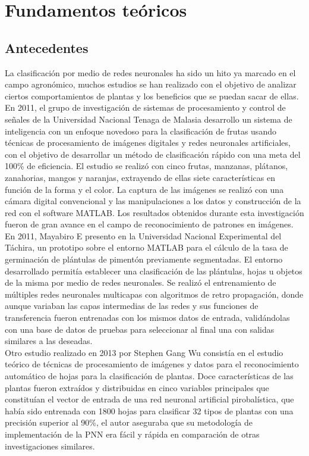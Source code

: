 \chapter{Fundamentos teóricos}

\section{Antecedentes}

La clasificación por medio de redes neuronales ha sido un hito ya marcado en el campo agronómico, muchos estudios se han realizado con el objetivo de analizar ciertos comportamientos de plantas y los beneficios que se puedan sacar de ellas. En 2011, el grupo de investigación de sistemas de procesamiento y control de señales de la Universidad Nacional Tenaga de Malasia desarrollo un sistema de inteligencia con un enfoque novedoso para la clasificación de frutas usando técnicas de procesamiento de imágenes digitales y redes neuronales artificiales, con el objetivo de desarrollar un método de clasificación rápido con una meta del 100\% de eficiencia. El estudio se realizó con cinco frutas, manzanas, plátanos, zanahorias, mangos y naranjas, extrayendo de ellas siete características en función de la forma y el color. La captura de las imágenes se realizó con una cámara digital convencional y las manipulaciones a los datos y construcción de la red con el software MATLAB. Los resultados obtenidos durante esta investigación fueron de gran avance en el campo de reconocimiento de patrones en imágenes.\\

En 2011, Mayabiro E presento en la Universidad Nacional Experimental del Táchira, un prototipo sobre el entorno MATLAB para el cálculo de la tasa de germinación de plántulas de pimentón previamente segmentadas. El entorno desarrollado permitía establecer una clasificación de las plántulas, hojas u objetos de la misma por medio de redes neuronales. Se realizó el entrenamiento de múltiples redes neuronales multicapas con algoritmos de retro propagación, donde aunque variaban las capas intermedias de las redes y sus funciones de transferencia fueron entrenadas con los mismos  datos de entrada, validándolas con una base de datos de pruebas para seleccionar al final una con salidas similares a las deseadas.\\

Otro estudio realizado en 2013 por Stephen Gang Wu consistía en el estudio teórico de técnicas de procesamiento de imágenes y datos para el reconocimiento automático de hojas para la clasificación de plantas. Doce características de las plantas fueron extraídos y distribuidas en cinco variables principales que constituían el vector de entrada de una red neuronal artificial pirobalística, que había sido entrenada con 1800 hojas para clasificar 32 tipos de plantas con una precisión superior al 90\%, el autor aseguraba que su metodología de implementación de la PNN era fácil y rápida en comparación de otras investigaciones similares.\\

